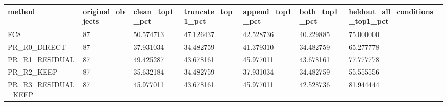 \begin{tabular}{lllllll}
\toprule
method & original\_objects & clean\_top1\_pct & truncate\_top1\_pct & append\_top1\_pct & both\_top1\_pct & heldout\_all\_conditions\_top1\_pct \\
\midrule
FC8 & 87 & 50.574713 & 47.126437 & 42.528736 & 40.229885 & 75.000000 \\
PR\_R0\_DIRECT & 87 & 37.931034 & 34.482759 & 41.379310 & 34.482759 & 65.277778 \\
PR\_R1\_RESIDUAL & 87 & 49.425287 & 43.678161 & 45.977011 & 43.678161 & 77.777778 \\
PR\_R2\_KEEP & 87 & 35.632184 & 34.482759 & 37.931034 & 34.482759 & 55.555556 \\
PR\_R3\_RESIDUAL\_KEEP & 87 & 45.977011 & 43.678161 & 45.977011 & 42.528736 & 81.944444 \\
\bottomrule
\end{tabular}
